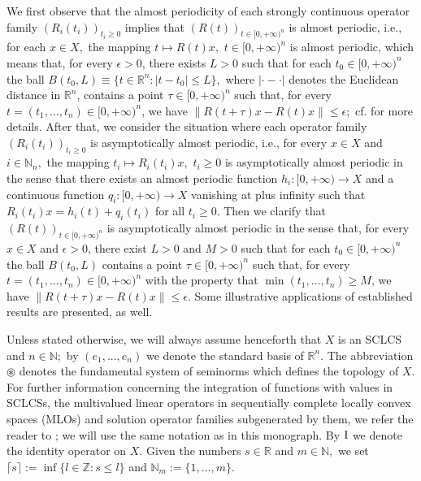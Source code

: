 \documentclass{amsart}
\theoremstyle{definition}
\theoremstyle{remark}
\numberwithin{equation}{section}
\begin{document}
We first observe that the almost periodicity of each strongly continuous operator family $(R_{i}(t_{i}))_{t_{i}\geq 0}$ implies that $(R(t))_{t\in [0,+\infty)^{n}}$ is almost periodic, i.e., for each $x\in X,$ the mapping $t\mapsto R(t)x,$ $t\in [0,+\infty)^{n}$ is almost periodic, which means that,
for every $\epsilon>0$, there exists $L>0$ such that for each $t_{0}\in [0,+\infty)^{n}$ the ball $B(t_{0},L)\equiv \{t\in {\mathbb R}^{n} : |t-t_{0}|\leq L \},$ where $|\cdot - \cdot|$ denotes the Euclidean distance in ${\mathbb R}^{n}$, contains a point $\tau \in  [0,+\infty)^{n}$ such that, for every $t=(t_{1},...,t_{n})\in [0,+\infty)^{n}$, we have $\|R(t+\tau)x-R(t)x\| \leq \epsilon ;$ cf. \cite{nova-selected} for more details. After that, we consider the situation where
each operator family $(R_{i}(t_{i}))_{t_{i}\geq 0}$ is asymptotically almost periodic, i.e., for every $x\in X$ and $i\in {\mathbb N}_{n} ,$ the mapping $t_{i}\mapsto R_{i}(t_{i})x,$ $t_{i}\geq 0$ is asymptotically almost periodic in the sense that there exists an almost periodic function $h_{i} : [0,+\infty)\rightarrow X$ and a continuous function $q_{i} : [0,+\infty)\rightarrow X$ vanishing at plus infinity such that $R_{i}(t_{i})x=h_{i}(t)+q_{i}(t_{i}) $ for all $t_{i}\geq 0.$ Then we clarify that $(R(t))_{t\in [0,+\infty)^{n}}$ is asymptotically almost periodic in the sense that, for every $x\in X$ and $\epsilon>0$, there exist $L>0$ and $M>0$ such that for each $t_{0}\in [0,+\infty)^{n}$ the ball $B(t_{0},L)$ contains a point $\tau \in  [0,+\infty)^{n}$ such that, for every $t=(t_{1},...,t_{n})\in [0,+\infty)^{n}$ with the property that $\min(t_{1},...,t_{n})\geq M$, we have $\|R(t+\tau)x-R(t)x\| \leq \epsilon.$  Some illustrative applications of established results are presented, as well.\vspace{0.1cm}

 Unless stated otherwise, we will always assume henceforth that $X$ is an SCLCS and $n\in {\mathbb N};$ by $(e_{1},...,e_{n})$ we denote the standard basis of ${\mathbb R}^{n}.$ 
The abbreviation $\circledast$ denotes the fundamental system of seminorms which defines the topology of $X.$ For further information concerning the integration of functions with values in SCLCSs, the multivalued linear operators in sequentially complete locally convex spaces (MLOs) and solution operator families subgenerated by them, we refer the reader to \cite{FKP}; we will use the same notation as in this monograph. By ${\rm I}$ we denote the identity operator on $X.$ Given the numbers $s\in\mathbb R$ and $m\in {\mathbb N},$ we set $\lceil s\rceil:=\inf\{l\in\mathbb Z:s\leq l\}$ and ${\mathbb N}_{m}:=\{1,...,m\} .$ %
 
\end{document}
